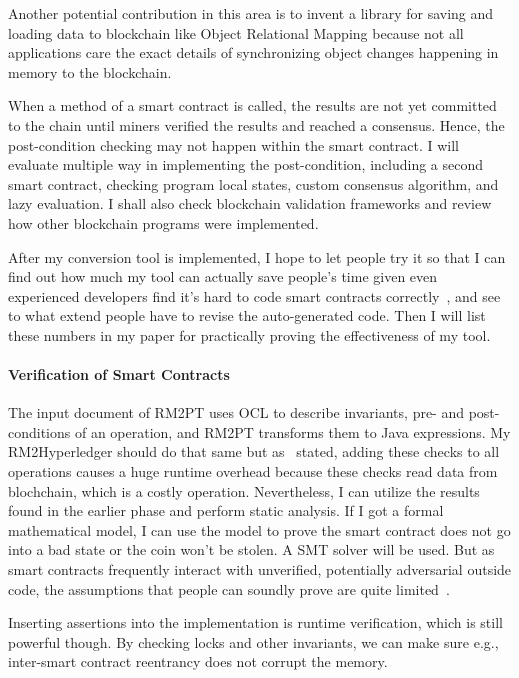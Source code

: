Another potential contribution in this area is to invent a library for saving and loading data to blockchain like Object Relational Mapping because
not all applications care the exact details of synchronizing object changes happening in memory to the blockchain.

When a method of a smart contract is called, the results are not yet committed to the chain until miners verified the results and reached a consensus. Hence, the post-condition checking may not happen within the smart contract. I will evaluate multiple way in implementing the post-condition, including a second smart contract, checking program local states, custom consensus algorithm, and lazy evaluation.
I shall also check blockchain validation frameworks and review how other blockchain programs were implemented.

After my conversion tool is implemented, I hope to let people try it so that I can find out how much my tool can actually save people's time given even experienced developers find it's hard to code smart contracts correctly~\cite{dao2019challenges}, and see to what extend people have to revise the auto-generated code. Then I will list these numbers in my paper for practically proving the effectiveness of my tool.



\paragraph*{Verification of Smart Contracts}
The input document of RM2PT uses OCL to describe invariants, pre- and post-conditions of an operation, and RM2PT transforms them to Java expressions.
My RM2Hyperledger should do that same but as~\cite{li2020securing} stated, adding these checks to all operations causes a huge runtime overhead because these checks read data from blochchain, which is a costly operation.
Nevertheless, I can utilize the results found in the earlier phase and perform static analysis.
If I got a formal mathematical model, I can use the model to prove the smart contract does not go into a bad state or the coin won't be stolen.
A SMT solver will be used.
But as smart contracts frequently interact with unverified, potentially adversarial outside code,
the assumptions that people can soundly prove are quite limited~\cite{bram2021rich}.

Inserting assertions into the implementation is runtime verification, which is still powerful though.
By checking locks and other invariants, we can make sure e.g., inter-smart contract reentrancy does not corrupt the memory.


